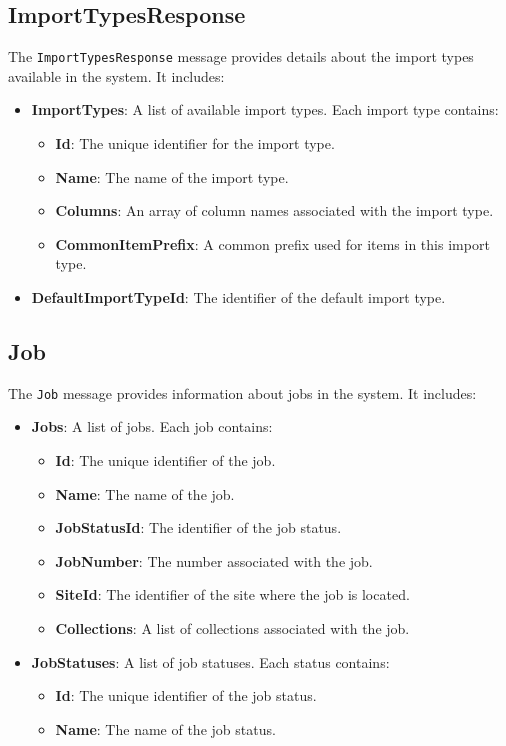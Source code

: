 \documentclass{memoir}
\begin{document}
	\subsection{ImportTypesResponse}
	The \texttt{ImportTypesResponse} message provides details about the import types available in the system. It includes:
	\begin{itemize}
		\item \textbf{ImportTypes}: A list of available import types. Each import type contains:
		\begin{itemize}
			\item \textbf{Id}: The unique identifier for the import type.
			\item \textbf{Name}: The name of the import type.
			\item \textbf{Columns}: An array of column names associated with the import type.
			\item \textbf{CommonItemPrefix}: A common prefix used for items in this import type.
		\end{itemize}
		\item \textbf{DefaultImportTypeId}: The identifier of the default import type.
	\end{itemize}
	
	\subsection{Job}
	The \texttt{Job} message provides information about jobs in the system. It includes:
	\begin{itemize}
		\item \textbf{Jobs}: A list of jobs. Each job contains:
		\begin{itemize}
			\item \textbf{Id}: The unique identifier of the job.
			\item \textbf{Name}: The name of the job.
			\item \textbf{JobStatusId}: The identifier of the job status.
			\item \textbf{JobNumber}: The number associated with the job.
			\item \textbf{SiteId}: The identifier of the site where the job is located.
			\item \textbf{Collections}: A list of collections associated with the job.
		\end{itemize}
		\item \textbf{JobStatuses}: A list of job statuses. Each status contains:
		\begin{itemize}
			\item \textbf{Id}: The unique identifier of the job status.
			\item \textbf{Name}: The name of the job status.
		\end{itemize}
	\end{itemize}
	
\end{document}
